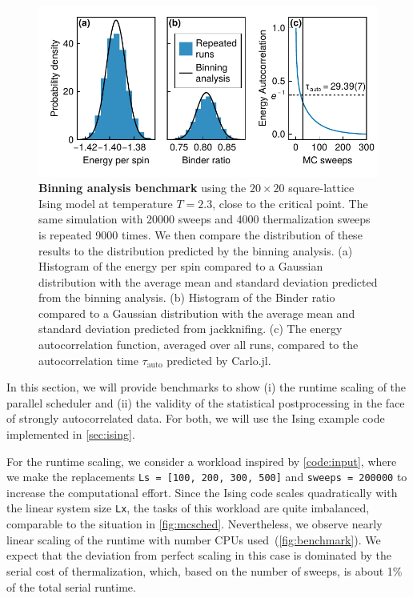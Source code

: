 \documentclass{SciPost}
\begin{document}
\begin{figure}
\begin{center}
\includegraphics{figs/stats.pdf}
\end{center}
\caption{\textbf{Binning analysis benchmark} using the $20\times 20$ square-lattice Ising model at temperature $T=2.3$, close to the critical point. The same simulation with 20000 sweeps and 4000 thermalization sweeps is repeated 9000 times. We then compare the distribution of these results to the distribution predicted by the binning analysis. (a) Histogram of the energy per spin compared to a Gaussian distribution with the average mean and standard deviation predicted from the binning analysis. (b) Histogram of the Binder ratio compared to a Gaussian distribution with the average mean and standard deviation predicted from jackknifing. (c) The energy autocorrelation function, averaged over all runs, compared to the autocorrelation time $\tau_\text{auto}$ predicted by Carlo.jl.}
\label{fig:statistics}
\end{figure}
In this section, we will provide benchmarks to show (i) the runtime scaling of the parallel scheduler and (ii) the validity of the statistical postprocessing in the face of strongly autocorrelated data. For both, we will use the Ising example code implemented in \cref{sec:ising}.

For the runtime scaling, we consider a workload inspired by \cref{code:input}, where we make the replacements \texttt{Ls = [100, 200, 300, 500]} and \texttt{sweeps = 200000} to increase the computational effort. Since the Ising code scales quadratically with the linear system size \texttt{Lx}, the tasks of this workload are quite imbalanced, comparable to the situation in \cref{fig:mcsched}. Nevertheless, we observe nearly linear scaling of the runtime with number CPUs used~(\cref{fig:benchmark}). We expect that the deviation from perfect scaling in this case is dominated by the serial cost of thermalization, which, based on the number of sweeps, is about 1\% of the total serial runtime.
\end{document}
